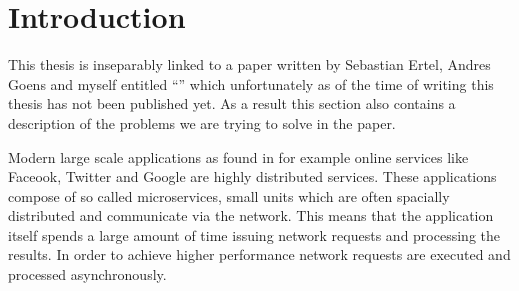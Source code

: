 \chapter{Introduction}

\label{ChapterIntro}

This thesis is inseparably linked to a paper written by Sebastian Ertel, Andres Goens and myself entitled ``\yauhauPaperTitle{}'' which unfortunately as of the time of writing this thesis has not been published yet.
As a result this section also contains a description of the problems we are trying to solve in the paper.

Modern large scale applications as found in for example online services like Faceook, Twitter and Google are highly distributed services.
These applications compose of so called microservices, small units which are often spacially distributed and communicate via the network.
This means that the application itself spends a large amount of time issuing network requests and processing the results.
In order to achieve higher performance network requests are executed and processed asynchronously.



%
%
%
%
%
%
%
